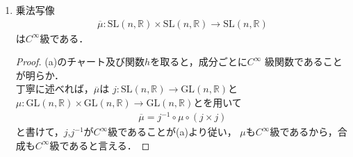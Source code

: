 \documentclass[dvipdfmx,a4paper,11pt]{jsarticle}
\begin{document}
\begin{enumerate}
\begin{enumerate}
\begin{proof}
      $(i,j)\neq(k,l)$なる$a_{ij}$たちが座標系をなす
      SL$(n,\mathbb{R})$のチャートである．
      さらに，陰関数定理より$U'\subseteq
      U\cap\text{SL}(n,\mathbb{R})$なる$A$の近傍$U'$において
      \begin{align}
        g(a_{11},\dots,a_{nn})=0
        \iff
        a_{kl}=h(\{a_{ij}\}_{(i,j)\neq(k,l)})
      \end{align}
      となる$C^\infty$級関数$h$が存在する．
      この$U'$が求める近傍である．
    \end{proof}
    \item 乗法写像
    \begin{align}
      \overline\mu\colon \text{SL}(n,\mathbb{R})\times
       \text{SL}(n,\mathbb{R})\to \text{SL}(n,\mathbb{R})
    \end{align}
    は$C^\infty$級である．
    \begin{proof}
      (a)のチャート及び関数$h$を取ると，成分ごとに$C^\infty$
      級関数であることが明らか．\\
      丁寧に述べれば，$\overline\mu$は
      $j\colon\text{SL}(n,\mathbb{R})\to\text{GL}(n,\mathbb{R})$と
      $\mu\colon \text{GL}(n,\mathbb{R})\times
      \text{GL}(n,\mathbb{R})\to \text{GL}(n,\mathbb{R})$とを用いて
      \begin{align}
        \overline\mu=j^{-1}\circ\mu\circ(j\times j)
      \end{align}
      と書けて，$j$,$j^{-1}$が$C^\infty$級であることが(a)より従い，
      $\mu$も$C^\infty$級であるから，合成も$C^\infty$級であると言える．
    \end{proof}
  \end{enumerate}
\end{enumerate}
\end{document}
